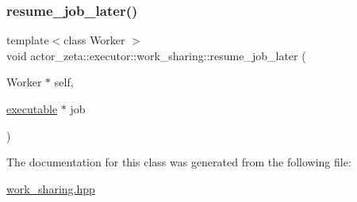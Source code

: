 \mbox{\label{classactor__zeta_1_1executor_1_1work__sharing_a74e9c2f71b9a8365e0f0712d625f2279}} 
\subsubsection{\texorpdfstring{resume\+\_\+job\+\_\+later()}{resume\_job\_later()}}
{\footnotesize\ttfamily template$<$class Worker $>$ \\
void actor\+\_\+zeta\+::executor\+::work\+\_\+sharing\+::resume\+\_\+job\+\_\+later (\begin{DoxyParamCaption}\item[{Worker $\ast$}]{self,  }\item[{\hyperlink{structactor__zeta_1_1executor_1_1executable}{executable} $\ast$}]{job }\end{DoxyParamCaption})\hspace{0.3cm}{\ttfamily [inline]}}



The documentation for this class was generated from the following file\+:\begin{DoxyCompactItemize}
\item 
\hyperlink{work__sharing_8hpp}{work\+\_\+sharing.\+hpp}\end{DoxyCompactItemize}
